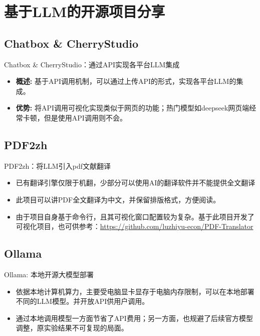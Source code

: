 \documentclass{beamer}
\begin{document}
\section{基于LLM的开源项目分享}
\subsection{Chatbox \& CherryStudio}
\begin{frame}{Chatbox \& CherryStudio：通过API实现各平台LLM集成}
  \begin{itemize}
    \item \textbf{概述:} 基于API调用机制，可以通过上传API的形式，实现各平台LLM的集成。
    \item \textbf{优势:} 将API调用可视化实现类似于网页的功能；热门模型如deepseek网页端经常卡顿，但是使用API调用则不会。
  \end{itemize}
\end{frame}

\subsection{PDF2zh}
\begin{frame}{PDF2zh：将LLM引入pdf文献翻译}
  \begin{itemize}
    \item 已有翻译引擎仅限于机翻，少部分可以使用AI的翻译软件并不能提供全文翻译
    \item 此项目可以讲PDF全文翻译为中文，并保留排版格式，方便阅读。
    \item 由于项目自身基于命令行，且其可视化窗口配置较为复杂。基于此项目开发了可视化项目，也可供参考：\url{https://github.com/luzhiyu-econ/PDF-Translator}
  \end{itemize}
\end{frame}

\subsection{Ollama}
\begin{frame}{Ollama: 本地开源大模型部署}
  \begin{itemize}
    \item 依据本地计算机算力，主要受电脑显卡显存于电脑内存限制，可以在本地部署不同的LLM模型。并开放API供用户调用。
    \item 通过本地调用模型一方面节省了API费用；另一方面，也规避了后续官方模型调整，原实验结果不可复现的局面。
  \end{itemize}
\end{frame}
\end{document}
